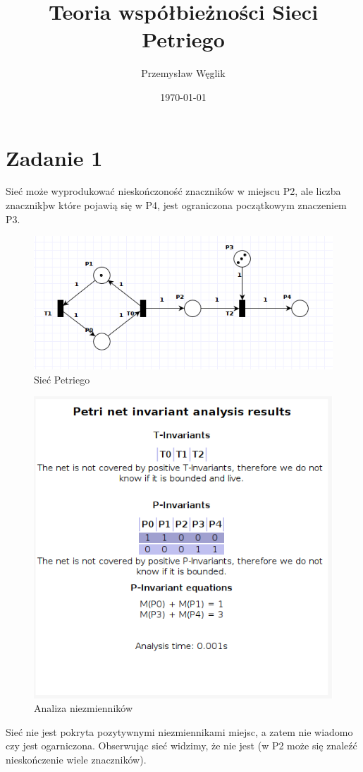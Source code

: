 \documentclass[12pt,a4paper,table]{article}
\begin{document}
    \title {
        Teoria współbieżności
        Sieci Petriego
    }

    \author{
        Przemysław Węglik
    }

    \date{\today}

    \maketitle

    \section{Zadanie 1}
    Sieć może wyprodukować nieskończoność znaczników w miejscu P2, ale
    liczba znacznikþw które pojawią się w P4, jest ograniczona początkowym znaczeniem P3.
    \begin{figure}[H]
        \centering
        \includegraphics[width=0.6\linewidth]{img/zad1-1.png}
        \caption{Sieć Petriego}
        \label{fig:zad1-1}
    \end{figure}

    \begin{figure}[H]
        \centering
        \includegraphics[width=0.6\linewidth]{img/zad1-2.png}
        \caption{Analiza niezmienników}
        \label{fig:zad1-2}
    \end{figure}

    Sieć nie jest pokryta pozytywnymi niezmiennikami miejsc, a zatem nie wiadomo
    czy jest ogarniczona. Obserwując sieć widzimy, że nie jest (w P2 może się znaleźć
    nieskończenie wiele znaczników).
\end{document}
